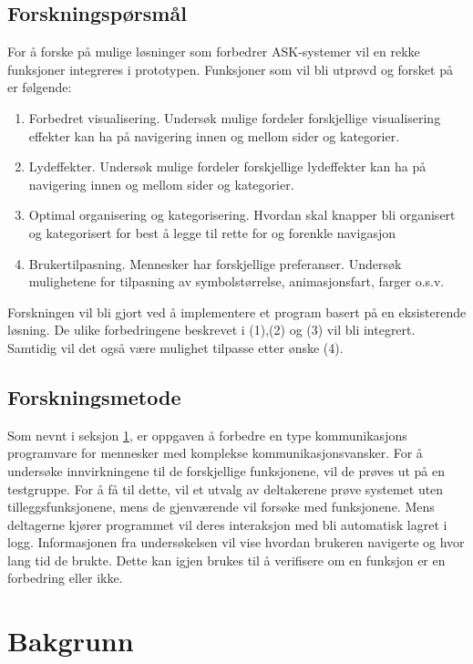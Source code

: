 \documentclass[phd,tocprelim]{cornell}
\begin{document}
\section{Forskningspørsmål}
\label{sec:ResearchQuestion}

For å forske på mulige løsninger som forbedrer ASK-systemer vil en rekke funksjoner integreres i prototypen. Funksjoner som vil bli utprøvd og forsket på er følgende:


\begin{enumerate} 
\label{lst:features}
\item Forbedret visualisering. Undersøk mulige fordeler forskjellige visualisering effekter kan ha på navigering innen og mellom sider og kategorier.
\item Lydeffekter. Undersøk mulige fordeler forskjellige lydeffekter kan ha på navigering innen og mellom sider og kategorier.
\item Optimal organisering og kategorisering. Hvordan skal knapper bli organisert og kategorisert for best å legge til rette for og forenkle navigasjon
\item Brukertilpasning. Mennesker har forskjellige preferanser. Undersøk mulighetene for tilpasning av symbolstørrelse, animasjonsfart, farger o.s.v. 
\end{enumerate} 


Forskningen vil bli gjort ved å implementere et program basert på en eksisterende løsning. De ulike forbedringene beskrevet i (1),(2) og (3) vil bli integrert. Samtidig vil det også være mulighet tilpasse etter ønske (4). 


\section{Forskningsmetode}

Som nevnt i seksjon \ref{sec:ResearchQuestion}, er oppgaven å forbedre en type kommunikasjons programvare for mennesker med komplekse kommunikasjonsvansker. For å undersøke innvirkningene til de forskjellige funksjonene, vil de prøves ut på en testgruppe.
For å få til dette, vil et utvalg av deltakerene prøve systemet uten tilleggsfunksjonene, mens de gjenværende vil forsøke med funksjonene. Mens deltagerne kjører programmet vil deres interaksjon med bli automatisk lagret i logg. Informasjonen fra undersøkelsen vil vise hvordan brukeren navigerte og hvor lang tid de brukte. Dette kan igjen brukes til å verifisere om en funksjon er en forbedring eller ikke.


\chapter{Bakgrunn}
\end{document}
